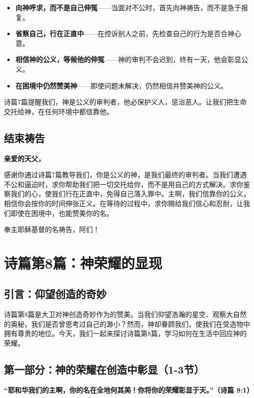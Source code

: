 \documentclass[a4paper, 12pt]{article}
\begin{document}
\begin{itemize}
    \item \textbf{向神呼求，而不是自己伸冤}——当面对不公时，首先向神祷告，而不是急于报复。
    \item \textbf{省察自己，行在正直中}——在控诉别人之前，先检查自己的行为是否合神心意。
    \item \textbf{相信神的公义，等候他的伸冤}——神的审判不会迟到，终有一天，他会彰显公义。
    \item \textbf{在困境中仍然赞美神}——即使问题未解决，仍然相信并赞美神的公义。
\end{itemize}

诗篇7篇提醒我们，神是公义的审判者，他必保护义人，惩治恶人。让我们把生命交托给神，在任何环境中都信靠他。

\subsection*{结束祷告}

\textbf{亲爱的天父，}

感谢你通过诗篇7篇教导我们，你是公义的神，是我们最终的审判者。当我们遭遇不公和逼迫时，求你帮助我们把一切交托给你，而不是用自己的方式解决。求你鉴察我们的心，使我们行在正直中，免得自己落入罪中。主啊，我们信靠你的公义，相信你会按你的时间伸张正义。在等待的过程中，求你赐给我们信心和忍耐，让我们即使在困境中，也能赞美你的名。

奉主耶稣基督的名祷告，阿们！

\newpage
\section{诗篇第8篇：神荣耀的显现}
\subsection*{引言：仰望创造的奇妙}

诗篇第8篇是大卫对神创造奇妙作为的赞美。当我们仰望浩瀚的星空、观察大自然的奥秘，我们是否曾思考过自己的渺小？然而，神却眷顾我们，使我们在受造物中拥有尊贵的地位。今天，我们一起来探讨诗篇第8篇，学习如何在生活中回应神的荣耀。

\subsection*{第一部分：神的荣耀在创造中彰显（1-3节）}

\textbf{“耶和华我们的主啊，你的名在全地何其美！你将你的荣耀彰显于天。”（诗篇 8:1）}
\end{document}
